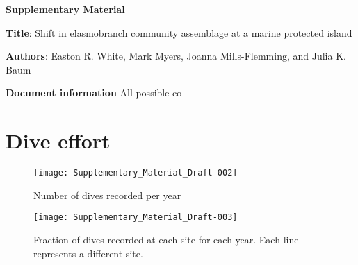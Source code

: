 \documentclass[a4paper]{article}
\begin{document}
\begin{center}
\textbf{Supplementary Material}
\bigskip
\end{center}

\textbf{Title}: Shift in elasmobranch community assemblage at a marine protected island
\bigskip

\textbf{Authors}: Easton R. White, Mark Myers, Joanna Mills-Flemming, and Julia K. Baum
\bigskip

\textbf{Document information}
All possible co
\pagebreak



\pagebreak




\section{Dive effort}



\begin{figure}[h!]
\texttt{[image: Supplementary\_Material\_Draft-002]}
\caption{Number of dives recorded per year}
\end{figure}


\begin{figure}[h!]
\texttt{[image: Supplementary\_Material\_Draft-003]}
\caption{Fraction of dives recorded at each site for each year. Each line represents a different site. }
\end{figure}

\end{document}
